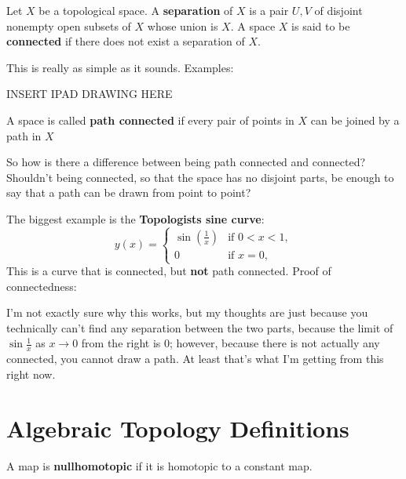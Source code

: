 \documentclass[12pt]{article}
\begin{document}
\begin{definition}
  Let $X$ be a topological space. A \textbf{separation} of $X$ is a pair $U, V$ of disjoint nonempty open subsets 
  of $X$ whose union is $X$. A space $X$ is said to be \textbf{connected} if there does not exist a separation 
  of $X$.
\end{definition}

This is really as simple as it sounds. Examples:

INSERT IPAD DRAWING HERE

\begin{definition}
  A space is called \textbf{path connected} if every pair of points in $X$ can be joined by a path in $X$
\end{definition}

\begin{uq}
  So how is there a difference between being path connected and connected? Shouldn't being connected, so that
  the space has no disjoint parts, be enough to say that a path can be drawn from point to point?
\end{uq}

\begin{answer}
  The biggest example is the \textbf{Topologists sine curve}:
  $$ y(x) = 
    \begin{cases}
      \sin\left( \frac{1}{x} \right) & \text{if } 0 < x < 1, \\
      0 & \text{if } x = 0,
    \end{cases} $$ 
  This is a curve that is connected, but \textbf{not} path connected.
  Proof of connectedness:

  \par I'm not exactly sure why this works, but my thoughts are just because you technically can't find any separation 
  between the two parts, because the limit of $\sin{\frac{1}{x}}$ as $x \to 0$ from the right is 0; however, because there 
  is not actually any connected, you cannot draw a path. At least that's what I'm getting from this right now. 
\end{answer}

\newpage

\section*{Algebraic Topology Definitions}

\begin{definition}
  A map is \textbf{nullhomotopic} if it is homotopic to a constant map.
\end{definition}
\end{document}
